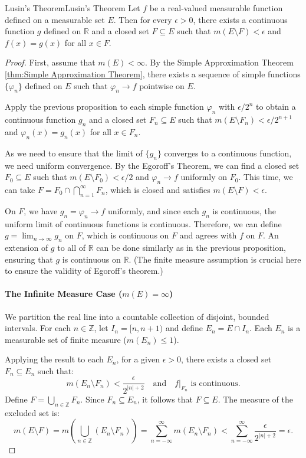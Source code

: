\documentclass[../main.tex]{subfiles}
\begin{document}
\begin{theorem}{Lusin's Theorem}{Lusin's Theorem}
	Let $f$ be a real-valued measurable function defined on a measurable set $E$. Then for every $\epsilon > 0$, there exists a continuous function $g$ defined on $\mathbb{R}$ and a closed set $F \subseteq E$ such that $m(E \setminus F) < \epsilon$ and $f(x) = g(x)$ for all $x \in F$.
\end{theorem}
\begin{proof}
	First, assume that $m(E) < \infty$. By the Simple Approximation Theorem \ref{thm:Simple Approximation Theorem}, there exists a sequence of simple functions $\{\varphi_n\}$ defined on $E$ such that $\varphi_n \to f$ pointwise on $E$.

	Apply the previous proposition to each simple function $\varphi_n$ with $\epsilon/2^n$ to obtain a continuous function $g_n$ and a closed set $F_n \subseteq E$ such that $m(E \setminus F_n) < \epsilon/2^{n+1}$ and $\varphi_n(x) = g_n(x)$ for all $x \in F_n$.

	As we need to ensure that the limit of $\{g_n\}$ converges to a continuous function, we need uniform convergence. By the Egoroff's Theorem, we can find a closed set $F_0 \subseteq E$ such that $m(E \setminus F_0) < \epsilon/2$ and $\varphi_n \to f$ uniformly on $F_0$. This time, we can take $F = F_0 \cap \bigcap_{n=1}^{\infty} F_n$, which is closed and satisfies $m(E \setminus F) < \epsilon$.

	On $F$, we have $g_n = \varphi_n \to f$ uniformly, and since each $g_n$ is continuous, the uniform limit of continuous functions is continuous. Therefore, we can define $g = \lim_{n \to \infty} g_n$ on $F$, which is continuous on $F$ and agrees with $f$ on $F$. An extension of $g$ to all of $\mathbb{R}$ can be done similarly as in the previous proposition, ensuring that $g$ is continuous on $\mathbb{R}$. (The finite measure assumption is crucial here to ensure the validity of Egoroff's theorem.)

	\paragraph{The Infinite Measure Case ($m(E) = \infty$)}
	We partition the real line into a countable collection of disjoint, bounded intervals. For each $n \in \mathbb{Z}$, let $I_n = [n, n+1)$ and define $E_n = E \cap I_n$. Each $E_n$ is a measurable set of finite measure ($m(E_n) \leq 1$).

	Applying the result to each $E_n$, for a given $\epsilon > 0$, there exists a closed set $F_n \subseteq E_n$ such that:
	\begin{equation*}
    	m(E_n \setminus F_n) < \frac{\epsilon}{2^{|n|+2}} \quad \text{and} \quad f|_{F_n} \text{ is continuous.}
	\end{equation*}
	Define $F = \bigcup_{n \in \mathbb{Z}} F_n$. Since $F_n \subseteq E_n$, it follows that $F \subseteq E$. The measure of the excluded set is:
	\begin{equation*}
    	m(E \setminus F) = m\left( \bigcup_{n \in \mathbb{Z}} (E_n \setminus F_n) \right) = \sum_{n=-\infty}^{\infty} m(E_n \setminus F_n) < \sum_{n=-\infty}^{\infty} \frac{\epsilon}{2^{|n|+2}} = \epsilon.
	\end{equation*}


\end{proof}
\end{document}
